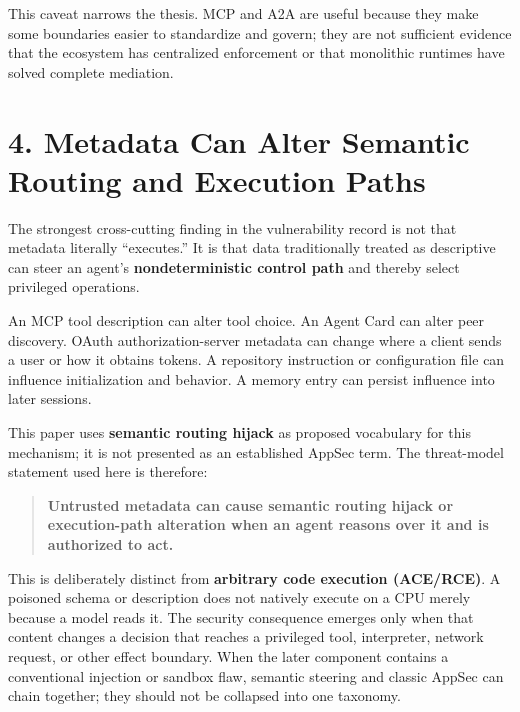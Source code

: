 \documentclass[
  10pt,
  letterpaper,
]{article}
\begin{document}
This caveat narrows the thesis. MCP and A2A are useful because they make
some boundaries easier to standardize and govern; they are not
sufficient evidence that the ecosystem has centralized enforcement or
that monolithic runtimes have solved complete mediation.

\section{4. Metadata Can Alter Semantic Routing and Execution
Paths}\label{metadata-can-alter-semantic-routing-and-execution-paths}

The strongest cross-cutting finding in the vulnerability record is not
that metadata literally ``executes.'' It is that data traditionally
treated as descriptive can steer an agent's \textbf{nondeterministic
control path} and thereby select privileged operations.

An MCP tool description can alter tool choice. An Agent Card can alter
peer discovery. OAuth authorization-server metadata can change where a
client sends a user or how it obtains tokens. A repository instruction
or configuration file can influence initialization and behavior. A
memory entry can persist influence into later sessions.

This paper uses \textbf{semantic routing hijack} as proposed vocabulary
for this mechanism; it is not presented as an established AppSec term.
The threat-model statement used here is therefore:

\begin{quote}
\textbf{Untrusted metadata can cause semantic routing hijack or
execution-path alteration when an agent reasons over it and is
authorized to act.}
\end{quote}

This is deliberately distinct from \textbf{arbitrary code execution
(ACE/RCE)}. A poisoned schema or description does not natively execute
on a CPU merely because a model reads it. The security consequence
emerges only when that content changes a decision that reaches a
privileged tool, interpreter, network request, or other effect boundary.
When the later component contains a conventional injection or sandbox
flaw, semantic steering and classic AppSec can chain together; they
should not be collapsed into one taxonomy.
\end{document}
